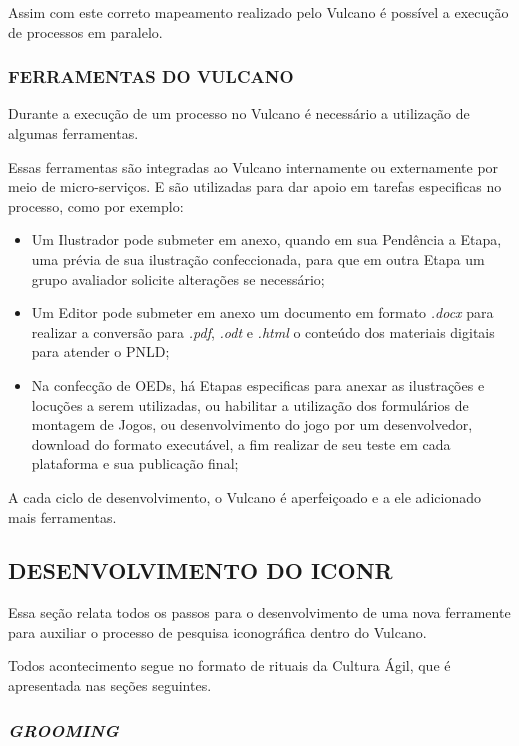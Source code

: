 \documentclass[
  12pt,				%
  openany,
  oneside,
  a4paper,			%
  english,			%
  brazil
]{article}
\numberwithin{figure}{section}
\numberwithin{table}{section}
\begin{document}
Assim com este correto mapeamento realizado pelo Vulcano é possível a execução de processos em paralelo.


\subsubsection{FERRAMENTAS DO VULCANO}

Durante a execução de um processo no Vulcano é necessário a utilização de algumas ferramentas. 

Essas ferramentas são integradas ao Vulcano internamente ou externamente por meio de micro-serviços. E são utilizadas para dar apoio em tarefas especificas no processo, como por exemplo:

\begin{itemize}
	\item Um Ilustrador pode submeter em anexo, quando em sua Pendência a Etapa, uma prévia de sua ilustração confeccionada, para que em outra Etapa um grupo avaliador solicite alterações se necessário;
	\item Um Editor pode submeter em anexo um documento em formato \emph{.docx} para realizar a conversão para \emph{.pdf}, \emph{.odt} e \emph{.html} o conteúdo dos materiais digitais para atender o PNLD;
	\item Na confecção de OEDs, há Etapas especificas para anexar as ilustrações e locuções a serem utilizadas, ou habilitar a utilização dos formulários de montagem de Jogos, ou desenvolvimento do jogo por um desenvolvedor, download do formato executável, a fim realizar de seu teste em cada plataforma e sua publicação final;
\end{itemize}

A cada ciclo de desenvolvimento, o Vulcano é aperfeiçoado e a ele adicionado mais ferramentas.


\subsection{DESENVOLVIMENTO DO ICONR}

Essa seção relata todos os passos para o desenvolvimento de uma nova ferramente para auxiliar o processo de pesquisa iconográfica dentro do Vulcano.

Todos acontecimento segue no formato de rituais da Cultura Ágil, que é apresentada nas seções seguintes.


\subsubsection{\textit{GROOMING}}
\end{document}
